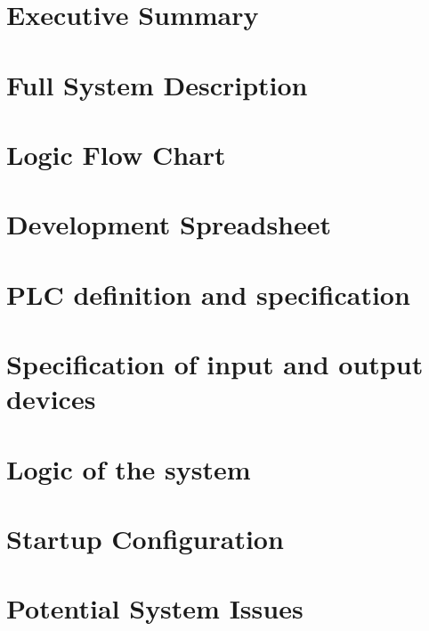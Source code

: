 \documentclass[12pt]{report}
\let\oldchapter\chapter%
\renewcommand{\chapter}{\cleardoublepage\oldchapter}%
\begin{document}
	\newpage
    

	\section{Executive Summary}
    
    \newpage
   
    \section{Full System Description} 
    
    
    \section{Logic Flow Chart}
    

    \section{Development Spreadsheet}
    
    
    \section{PLC definition and specification}
    
    
    \section{Specification of input and output devices}
    
    
    \section{Logic of the system}
    
    
    \section{Startup Configuration}
    
    
    \section{Potential System Issues}
    
    
    \appendix
    
\end{document}
